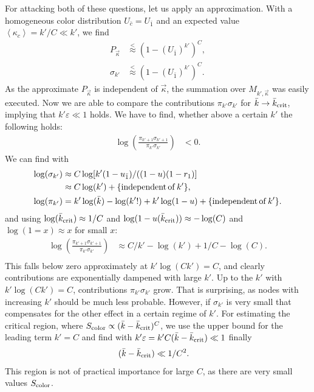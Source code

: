 \documentclass[aps, pre, onecolumn, a4paper, floatfix]{revtex4}
\begin{document}
For attacking both of these questions, let us apply an approximation. With a homogeneous color 
distribution $U_{\bar c}=U_{\bar 1}$ and an expected value $\left<\kappa_c \right>=k'/C \ll k'$, 
we find
\begin{align}
P_{\vec \kappa} &\stackrel{<}{\approx} (1-(U_{\bar 1})^{k'})^C,\\
\sigma_{k'} &\stackrel{<}{\approx} (1-(U_{\bar 1})^{k'})^C.
\end{align}
As the approximate $P_{\vec \kappa}$ is independent of $\vec \kappa$, the summation over $M_{k',\vec \kappa}$ was 
easily executed. Now we are able to compare the contributions $\pi_{k'}\sigma_{k'}$ for 
$\bar{k}\to \bar{k}_{\rm crit}$, implying that $k'\varepsilon\ll 1$ holds. We have to find, whether above a 
certain $k'$ the following holds:
\begin{align}
\log(\frac{\pi_{k'+1}\sigma_{k'+1}}{\pi_{k'}\sigma_{k'}}) &< 0.
\end{align}
We can find with 
\begin{align}
\log(\sigma_{k'})&\approx C \log[k' (1-u_{\bar 1})/((1-u)(1-r_1)]\\
&\approx C\log(k') +\{{\rm independent\, of\,} k'\},\\
\log(\pi_{k'}) &= k' \log(\bar{k}) - \log(k'!)+k'\log(1-u) +\{{\rm independent\, of\,} k'\}.\\
\end{align}
and using $\log(\bar{k}_{\rm crit})\approx 1/C$ and $\log(1-u(\bar{k}_{\rm crit}))\approx -\log(C)$ 
and $\log(1=x)\approx x$ for small $x$:
\begin{align}
\log(\frac{\pi_{k'+1}\sigma_{k'+1}}{\pi_{k'}\sigma_{k'}}) &\approx C/k' - \log(k') +1/C -\log(C).\\
\end{align}
This falls below zero approximately at $k'\log(Ck')=C$, and clearly contributions are exponentially 
dampened with large $k'$. Up to the $k'$ with $k'\log(Ck')=C$, contributions $\pi_{k'}\sigma_{k'}$ 
grow. That is surprising, as nodes with increasing $k'$ should be much less probable. However, 
if $\sigma_{k'}$ is very small that compensates for the other effect in a certain regime of $k'$. 
For estimating the critical region, where $S_{\rm color}\propto (\bar{k}-{\bar k}_{\rm crit})^C$, we 
use the upper bound for the leading term $k'=C$ and find with 
$k'\varepsilon=k'C (\bar{k}-{\bar k}_{\rm crit})\ll1$ finally 
\begin{align}
(\bar{k}-{\bar k}_{\rm crit}) &\ll 1/C^2.
\end{align}
This region is not of practical importance for large $C$, as there are very small values 
$S_{\rm color}$. 
\end{document}
